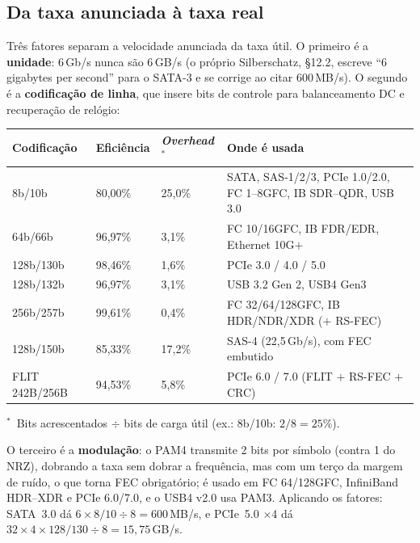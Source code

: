 \documentclass[11pt,a4paper]{article}
\begin{document}
\subsection{Da taxa anunciada à taxa real}

Três fatores separam a velocidade anunciada da taxa útil. O primeiro é a \textbf{unidade}:
6\,Gb/s nunca são 6\,GB/s (o próprio Silberschatz, §12.2, escreve ``6 gigabytes per second''
para o SATA-3 e se corrige ao citar 600\,MB/s). O segundo é a \textbf{codificação de linha},
que insere bits de controle para balanceamento DC e recuperação de relógio:

\begin{center}\small
\begin{tabular}{@{}lllp{7.4cm}@{}}
\toprule
\textbf{Codificação} & \textbf{Eficiência} & \textbf{\emph{Overhead}}$^{\ast}$ & \textbf{Onde é usada} \\
\midrule
8b/10b        & 80,00\% & 25,0\% & SATA, SAS-1/2/3, PCIe 1.0/2.0, FC 1--8GFC, IB SDR--QDR, USB 3.0 \\
64b/66b       & 96,97\% & 3,1\%  & FC 10/16GFC, IB FDR/EDR, Ethernet 10G$+$ \\
128b/130b     & 98,46\% & 1,6\%  & PCIe 3.0 / 4.0 / 5.0 \\
128b/132b     & 96,97\% & 3,1\%  & USB 3.2 Gen 2, USB4 Gen3 \\
256b/257b     & 99,61\% & 0,4\%  & FC 32/64/128GFC, IB HDR/NDR/XDR ($+$ RS-FEC) \\
128b/150b     & 85,33\% & 17,2\% & SAS-4 (22,5\,Gb/s), com FEC embutido \\
FLIT 242B/256B & 94,53\% & 5,8\% & PCIe 6.0 / 7.0 (FLIT $+$ RS-FEC $+$ CRC) \\
\bottomrule
\end{tabular}
\end{center}
{\footnotesize $^{\ast}$~Bits acrescentados $\div$ bits de carga útil (ex.: 8b/10b: $2/8=25\%$).\par}

O terceiro é a \textbf{modulação}: o PAM4 transmite 2 bits por símbolo (contra 1 do NRZ),
dobrando a taxa sem dobrar a frequência, mas com um terço da margem de ruído, o que torna FEC
obrigatório; é usado em FC 64/128GFC, InfiniBand HDR--XDR e PCIe 6.0/7.0, e o USB4 v2.0 usa
PAM3. Aplicando os fatores: SATA~3.0 dá $6 \times 8/10 \div 8 = 600$\,MB/s, e PCIe~5.0
$\times$4 dá $32 \times 4 \times 128/130 \div 8 = 15{,}75$\,GB/s.
\end{document}
